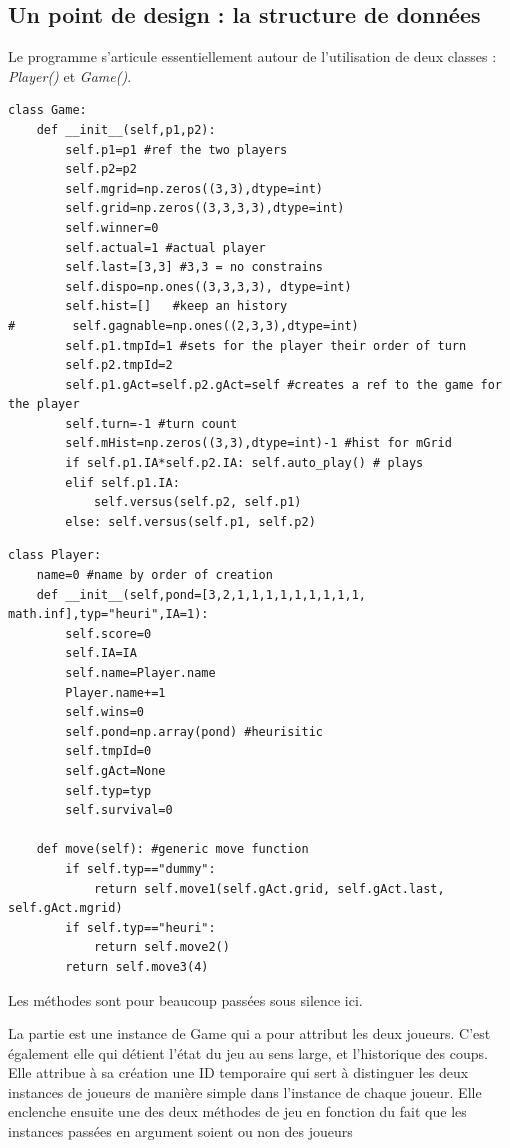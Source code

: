 \documentclass[10pt, french]{article}
\begin{document}
\subsection{Un point de design : la structure de données}
Le programme s'articule essentiellement autour de l'utilisation de deux classes : \emph{Player()} et 
\emph{Game()}.
\\
\begin{minipage}[]{.45\textwidth}
\begin{lstlisting}
class Game:
    def __init__(self,p1,p2):
        self.p1=p1 #ref the two players
        self.p2=p2
        self.mgrid=np.zeros((3,3),dtype=int) 
        self.grid=np.zeros((3,3,3,3),dtype=int)
        self.winner=0 
        self.actual=1 #actual player
        self.last=[3,3] #3,3 = no constrains
        self.dispo=np.ones((3,3,3,3), dtype=int)
        self.hist=[]   #keep an history
#        self.gagnable=np.ones((2,3,3),dtype=int)
        self.p1.tmpId=1 #sets for the player their order of turn
        self.p2.tmpId=2
        self.p1.gAct=self.p2.gAct=self #creates a ref to the game for the player
        self.turn=-1 #turn count
        self.mHist=np.zeros((3,3),dtype=int)-1 #hist for mGrid
        if self.p1.IA*self.p2.IA: self.auto_play() # plays
        elif self.p1.IA:
            self.versus(self.p2, self.p1)
        else: self.versus(self.p1, self.p2)
\end{lstlisting}
\end{minipage}
\begin{minipage}[]{.45\textwidth}
\begin{lstlisting}
class Player:
    name=0 #name by order of creation
    def __init__(self,pond=[3,2,1,1,1,1,1,1,1,1,1, math.inf],typ="heuri",IA=1):
        self.score=0 
        self.IA=IA
        self.name=Player.name
        Player.name+=1
        self.wins=0
        self.pond=np.array(pond) #heurisitic
        self.tmpId=0
        self.gAct=None
        self.typ=typ
        self.survival=0
       
    def move(self): #generic move function
        if self.typ=="dummy":
            return self.move1(self.gAct.grid, self.gAct.last, self.gAct.mgrid)
        if self.typ=="heuri":
            return self.move2()
        return self.move3(4)
\end{lstlisting}
\end{minipage}
\par Les méthodes sont pour beaucoup passées sous silence ici.
\par La partie est une instance de Game qui a pour attribut les deux joueurs. C'est également elle qui détient l'état du jeu au sens large, et l'historique des coups. Elle attribue à sa création une ID temporaire qui sert à distinguer les deux instances de joueurs de manière simple dans l'instance de chaque joueur. Elle enclenche ensuite une des deux méthodes de jeu en fonction du fait que les instances passées en argument soient ou non des joueurs
\end{document}
